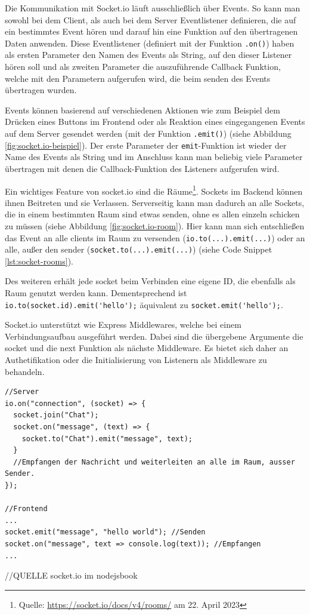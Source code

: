 \documentclass[a4paper,12pt]{report}
\begin{document}
Die Kommunikation mit Socket.io läuft ausschließlich über Events. So kann man sowohl bei dem Client, als auch bei dem Server Eventlistener definieren, die auf ein bestimmtes Event hören und darauf hin eine Funktion auf den übertragenen Daten anwenden. Diese Eventlistener (definiert mit der Funktion \verb|.on()|) haben als ersten Parameter den Namen des Events als String, auf den dieser Listener hören soll und als zweiten Parameter die auszuführende Callback Funktion, welche mit den Parametern aufgerufen wird, die beim senden des Events übertragen wurden.

Events können basierend auf verschiedenen Aktionen wie zum Beispiel dem Drücken eines Buttons im Frontend oder als Reaktion eines eingegangenen Events auf dem Server gesendet werden (mit der Funktion \verb|.emit()|) (siehe Abbildung \ref{fig:socket.io-beispiel}). Der erste Parameter der \verb|emit|-Funktion ist wieder der Name des Events als String und im Anschluss kann man beliebig viele Parameter übertragen mit denen die Callback-Funktion des Listeners aufgerufen wird.

Ein wichtiges Feature von socket.io sind die Räume\footnote{Quelle: \url{https://socket.io/docs/v4/rooms/} am 22. April 2023}. Sockets im Backend können ihnen Beitreten und sie Verlassen. Serverseitig kann man dadurch an alle Sockets, die in einem bestimmten Raum sind etwas senden, ohne es allen einzeln schicken zu müssen (siehe Abbildung \ref{fig:socket.io-room}). Hier kann man sich entschließen das Event an alle clients im Raum zu versenden (\verb|io.to(...).emit(...)|) oder an alle, außer den sender (\verb|socket.to(...).emit(...)|) (siehe Code Snippet \ref{lst:socket-rooms}).

Des weiteren erhält jede socket beim Verbinden eine eigene ID, die ebenfalls als Raum genutzt werden kann. Dementsprechend ist \verb|io.to(socket.id).emit('hello');| äquivalent zu \verb|socket.emit('hello');|.

Socket.io unterstützt wie Express Middlewares, welche bei einem Verbindungsaufbau ausgeführt werden. Dabei sind die übergebene Argumente die socket und die next Funktion als nächste Middleware.
Es bietet sich daher an Authetifikation oder die Initialisierung von Listenern als Middleware  zu behandeln.


\begin{lstlisting}[style=codeStyle, caption={Beispiel zum Beitreten Raums und das senden eines Events in diesen Raum}, label={lst:socket-rooms}]
//Server
io.on("connection", (socket) => {
  socket.join("Chat");
  socket.on("message", (text) => {
  	socket.to("Chat").emit("message", text);
  }
  //Empfangen der Nachricht und weiterleiten an alle im Raum, ausser Sender.
});

//Frontend
...
socket.emit("message", "hello world"); //Senden
socket.on("message", text => console.log(text)); //Empfangen
...
\end{lstlisting}
//QUELLE socket.io im nodejsbook
\end{document}
